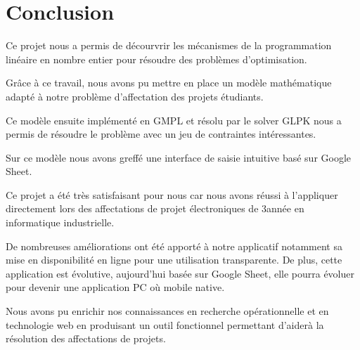 \documentclass[final,poster]{polytech/polytech}
\begin{document}


\chapter*{Conclusion}

Ce projet nous a permis de décourvrir les mécanismes de la programmation linéaire en nombre entier pour résoudre des problèmes d'optimisation. 

Grâce à ce travail, nous avons pu mettre en place un modèle mathématique adapté à notre problème d'affectation des projets étudiants. 

Ce modèle ensuite implémenté en GMPL et résolu par le solver GLPK nous a permis de résoudre le problème avec un jeu de contraintes intéressantes.

Sur ce modèle nous avons greffé une interface de saisie intuitive basé sur Google Sheet.

Ce projet a été très satisfaisant pour nous car nous avons réussi à l'appliquer directement lors des affectations de projet électroniques de 3\ieme année en informatique industrielle.

De nombreuses améliorations ont été apporté à notre applicatif notamment sa mise en disponibilité en ligne pour une utilisation transparente. 
De plus, cette application est évolutive, aujourd'hui basée sur Google Sheet, elle pourra évoluer pour devenir une application PC où mobile native.

Nous avons pu enrichir nos connaissances en recherche opérationnelle et en technologie web en produisant un outil fonctionnel permettant d'aiderà la résolution des affectations de projets.

\end{document}
